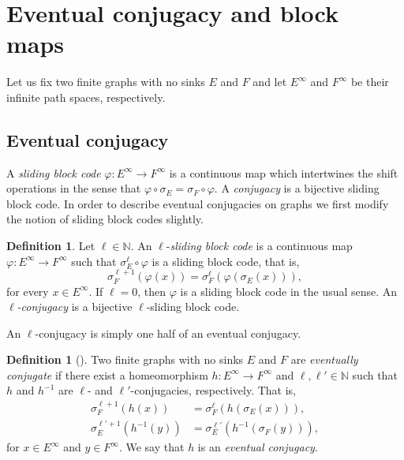 \documentclass[12pt,a4paper,oneside,reqno,final]{amsart}
\newcommand{\LRA}{\longrightarrow}
\newcommand{\N}{\mathbb{N}}
\theoremstyle{definition}
\newtheorem{definition}[lemma]{Definition}
\numberwithin{equation}{section} %
\begin{document}
\section{Eventual conjugacy and block maps}
\label{sec:block-maps}

Let us fix two finite graphs with no sinks $E$ and $F$ and let $E^\infty$ and $F^\infty$ be their infinite path spaces, respectively.


\subsection{Eventual conjugacy}

A \emph{sliding block code} $\varphi\colon E^\infty \LRA F^\infty$ is a continuous map which intertwines the shift operations
in the sense that $\varphi\circ \sigma_E = \sigma_F\circ \varphi$.
A \emph{conjugacy} is a bijective sliding block code.
In order to describe eventual conjugacies on graphs we first modify the notion of sliding block codes slightly.

\begin{definition}
    Let $\ell\in \N$.
    An $\ell$-\emph{sliding block code} is a continuous map $\varphi\colon E^{\infty}\LRA F^\infty$ such that $\sigma_E^\ell\circ \varphi$
    is a sliding block code, that is,
    \[
        \sigma_F^{\ell + 1}(\varphi(x)) = \sigma_F^\ell(\varphi(\sigma_E(x))),
    \]
    for every $x\in E^{\infty}$.
    If $\ell = 0$, then $\varphi$ is a sliding block code in the usual sense.
    An \emph{$\ell$-conjugacy} is a bijective $\ell$-sliding block code.
\end{definition}

An $\ell$-conjugacy is simply one half of an eventual conjugacy.

\begin{definition}[\cite{Mat2017-circle}]
    Two finite graphs with no sinks $E$ and $F$ are \emph{eventually conjugate} if there exist a homeomorphism $h\colon E^\infty\LRA F^\infty$ 
    and $\ell, \ell'\in \N$ such that $h$ and $h^{-1}$ are $\ell$- and $\ell'$-conjugacies, respectively.
    That is, 
    \begin{align*}
        \sigma_F^{\ell + 1}(h(x)) &= \sigma_F^\ell(h(\sigma_E(x))), \\
        \sigma_E^{\ell' + 1}(h^{-1}(y)) &= \sigma_E^{\ell'}(h^{-1}(\sigma_F(y)))     ,
    \end{align*}
    for $x\in E^\infty$ and $y\in F^\infty$.
    We say that $h$ is an \emph{eventual conjugacy}.
\end{definition}
\end{document}
